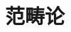 \documentclass[../main.tex]{subfiles}
\begin{document}
\setcounter{chapter}{1}
\chapter{范畴论}\label{cha:linear_algebra}
\end{document}
